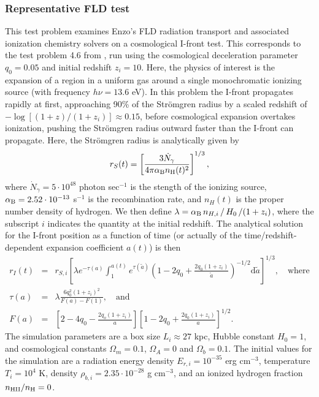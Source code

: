 \subsubsection{Representative FLD test}
\label{sec.tests.fld}

This test problem examines Enzo's FLD radiation transport and
associated ionization chemistry solvers on a cosmological I-front
test.  This corresponds to the test problem 4.6
from \cite{ReynoldsHayesPaschosNorman2009}, run using the cosmological
deceleration parameter $q_0 = 0.05$ and initial redshift $z_i=10$.
Here, the physics of interest is the expansion of a  region in a
uniform gas around a single monochromatic ionizing source (with
frequency $h\nu = 13.6$ eV).  In this problem the I-front propagates
rapidly at first, approaching 90\% of the Str{\" o}mgren radius by a
scaled redshift of $-\log\left[(1+z)/(1+z_i)\right] \approx 0.15$,
before cosmological expansion overtakes ionization, pushing the Str{\"
o}mgren radius outward faster than the I-front can propagate.  Here,
the Str{\" o}mgren radius is analytically given by
\[
   r_S(t) = \left[\frac{3\dot{N}_{\gamma}}{4\pi \alpha_{\rm B}
   n_{\rm H}(t)^2}\right]^{1/3}, 
\]
where $\dot{N}_{\gamma} = 5\cdot10^{48}$ photon sec$^{-1}$ is the
stength of the ionizing source, $\alpha_{\rm B} = 2.52\cdot10^{-13}$
s$^{-1}$ is the  recombination rate, and $n_H(t)$ is the
proper number density of hydrogen.  We then define $\lambda =
\alpha_{\rm B}\, n_{H,i}\, /\, H_0\, / (1+z_i)$, where the subscript $i$
indicates the quantity at the initial redshift.  The analytical
solution for the I-front position as a function of time (or actually
of the time/redshift-dependent expansion coefficient $a(t)$) is then
\begin{eqnarray*}
   r_I(t) &=& r_{S,i} \left[\lambda e^{-\tau(a)} \int_1^{a(t)}
     e^{\tau(\tilde a)} \left(1 - 2q_0
     + \frac{2q_0(1+z_i)}{\tilde{a}}\right)^{-1/2}\mathrm
     d\tilde{a}\right]^{1/3}, \quad\text{where} \\ 
   \tau(a) &=& \lambda\frac{6q_0^2(1+z_i)^2}{F(a)-F(1)}, 
     \quad\text{and} \\
   F(a) &=& \left[2-4q_0 - \frac{2q_o(1+z_i)}{a}\right] 
      \left[1-2q_0 + \frac{2q_0(1+z_i)}{a}\right]^{1/2}.
\end{eqnarray*}
The simulation parameters are a box size $L_i\approx 27$ kpc, Hubble
constant $H_0 = 1$, and cosmological constants $\Omega_m = 0.1$,
$\Omega_A=0$ and $\Omega_b = 0.1$.  The initial values for the
simulation are a radiation energy density $E_{r,i} = 10^{-35}$ erg
cm$^{-3}$, temperature $T_i = 10^4$ K, density $\rho_{b,i} =
2.35\cdot10^{-28}$ g cm$^{-3}$, and an ionized hydrogen fraction
$n_{\rm HII}/n_{\rm H} = 0$.

